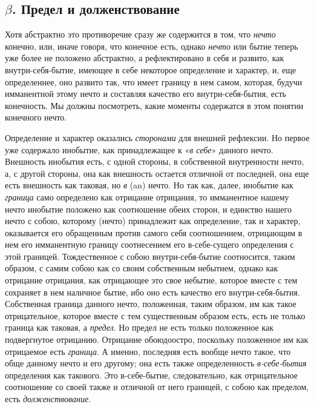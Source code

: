 \bigskip

\subsection*{$\beta $. Предел и долженствование}

Хотя абстрактно это противоречие сразу же содержится в том, что
{\em нечто} конечно, или, иначе говоря, что конечное
есть, однако {\em нечто} или бытие теперь уже более не
положено абстрактно, а рефлектировано в себя и развито, как
внутри-себя-бытие, имеющее в себе некоторое определение и характер, и, еще
определеннее, оно развито так, что имеет границу в нем самом, которая,
будучи имманентной этому нечто и составляя качество его внутри-себя-бытия,
есть конечность. Мы должны посмотреть, какие моменты содержатся в этом
понятии конечного нечто.

Определение и характер оказались {\em сторонами} для
внешней рефлексии. Но первое уже содержало инобытие, как принадлежащее к
«{\em в себе}» данного нечто. Внешность инобытия есть,
с одной стороны, в собственной внутренности нечто, а, с другой стороны, она
как внешность остается отличной от последней, она еще есть внешность как
таковая, но {\em в} (an) нечто. Но так как, далее,
инобытие как {\em граница} само определено как
отрицание отрицания, то имманентное нашему нечто инобытие положено как
соотношение обеих сторон, и единство нашего нечто с собою, которому (нечто)
принадлежит как определение, так и характер, оказывается его обращенным
против самого себя соотношением, отрицающим в нем его имманентную границу
соотнесением его в-себе-сущего определения с этой границей. Тождественное с
собою внутри-себя-бытие соотносится, таким образом, с самим собою как со
своим собственным небытием, однако как отрицание отрицания, как отрицающее
это свое небытие, которое вместе с тем сохраняет в нем наличное бытие, ибо
оно есть качество его внутри-себя-бытия. Собственная граница данного нечто,
положенная, таким образом, им как такое отрицательное, которое вместе с тем
существенным образом есть, есть не только граница как таковая, а
{\em предел}. Но предел не есть только положенное как
подвергнутое отрицанию. Отрицание обоюдоостро, поскольку положенное им как
отрицаемое есть {\em граница}. А именно, последняя есть
вообще нечто такое, что обще данному нечто и его другому; она есть также
определенность {\em в-себе-бытия} определения как
такового. Это в-себе-бытие, следовательно, как отрицательное соотношение со
своей также и отличной от него границей, с собою как пределом, есть
{\em долженствование}.

